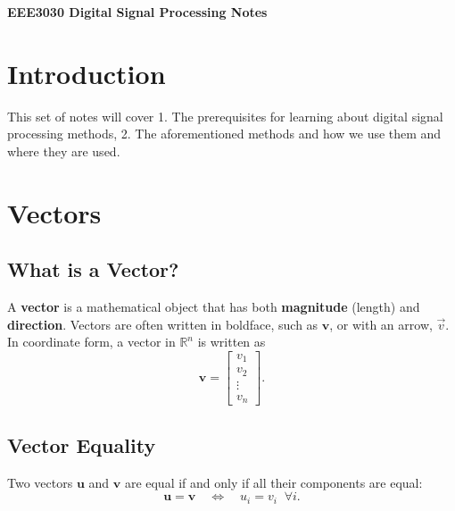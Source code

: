 \documentclass[a4paper,12pt]{article}
\begin{document}
\pagestyle{empty} 

\begin{titlepage}
    \centering
    \vspace*{2cm}
    \Huge{\textbf{EEE3030 Digital Signal Processing Notes}} \\[1.5cm]
    \vfill
\end{titlepage}

\tableofcontents
\newpage

\section{\Large\textbf{Introduction}}

This set of notes will cover 1. The prerequisites for learning about digital signal processing methods, 2. The aforementioned methods and how we use them and where they are used. 

\section{\Huge\textbf{Vectors}}

\subsection{What is a Vector?}
A \textbf{vector} is a mathematical object that has both \textbf{magnitude} (length) and \textbf{direction}. 
Vectors are often written in boldface, such as $\mathbf{v}$, or with an arrow, $\vec{v}$. 
In coordinate form, a vector in $\mathbb{R}^n$ is written as
\[
\mathbf{v} = \begin{bmatrix} v_1 \\ v_2 \\ \vdots \\ v_n \end{bmatrix}.
\]

\subsection{Vector Equality}
Two vectors $\mathbf{u}$ and $\mathbf{v}$ are equal if and only if all their components are equal:
\[
\mathbf{u} = \mathbf{v} \quad \Leftrightarrow \quad u_i = v_i \;\; \forall i.
\]
\end{document}

